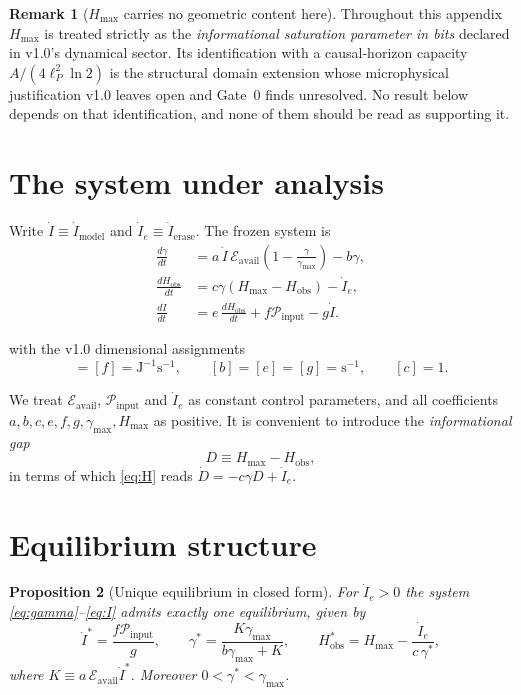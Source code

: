 \documentclass[11pt,a4paper]{article}
\newtheorem{proposition}{Proposition}
\theoremstyle{definition}
\newtheorem{remark}[proposition]{Remark}
\begin{document}
\begin{remark}[$H_{\max}$ carries no geometric content here]
\label{rem:hmax}
Throughout this appendix $H_{\max}$ is treated strictly as the
\emph{informational saturation parameter in bits} declared in v1.0's dynamical
sector. Its identification with a causal-horizon capacity
$A/(4\ell_P^2\ln 2)$ is the structural domain extension whose microphysical
justification v1.0 leaves open and Gate~0 finds unresolved. No result below
depends on that identification, and none of them should be read as supporting
it.
\end{remark}

\section{The system under analysis}

Write $\dot I \equiv \dot I_{\text{model}}$ and $\dot I_e \equiv
\dot I_{\text{erase}}$. The frozen system is
\begin{align}
\frac{d\gamma}{dt} &= a\,\dot I\,\mathcal{E}_{\text{avail}}
  \left(1-\frac{\gamma}{\gamma_{\max}}\right)-b\gamma,
  \label{eq:gamma}\\[4pt]
\frac{dH_{\text{obs}}}{dt} &= c\gamma\left(H_{\max}-H_{\text{obs}}\right)
  -\dot I_e, \label{eq:H}\\[4pt]
\frac{d\dot I}{dt} &= e\,\frac{dH_{\text{obs}}}{dt}
  +f\mathcal{P}_{\text{input}}-g\dot I. \label{eq:I}
\end{align}

with the v1.0 dimensional assignments
\begin{equation}
[a]=[f]=\mathrm{J^{-1}s^{-1}},\qquad
[b]=[e]=[g]=\mathrm{s^{-1}},\qquad
[c]=1 .
\end{equation}

We treat $\mathcal{E}_{\text{avail}}$, $\mathcal{P}_{\text{input}}$ and
$\dot I_e$ as constant control parameters, and all coefficients
$a,b,c,e,f,g,\gamma_{\max},H_{\max}$ as positive. It is convenient to
introduce the \emph{informational gap}
\begin{equation}
D \equiv H_{\max}-H_{\text{obs}},
\end{equation}
in terms of which \eqref{eq:H} reads $\dot D = -c\gamma D+\dot I_e$.

\section{Equilibrium structure}

\begin{proposition}[Unique equilibrium in closed form]
\label{prop:fp}
For $\dot I_e>0$ the system \eqref{eq:gamma}--\eqref{eq:I} admits exactly one
equilibrium, given by
\begin{equation}
\boxed{\;
\dot I^{*}=\frac{f\mathcal{P}_{\text{input}}}{g},\qquad
\gamma^{*}=\frac{K\gamma_{\max}}{b\gamma_{\max}+K},\qquad
H^{*}_{\text{obs}}=H_{\max}-\frac{\dot I_e}{c\,\gamma^{*}},\;}
\label{eq:fp}
\end{equation}
where $K\equiv a\,\mathcal{E}_{\text{avail}}\dot I^{*}$. Moreover
$0<\gamma^{*}<\gamma_{\max}$.
\end{proposition}
\end{document}
